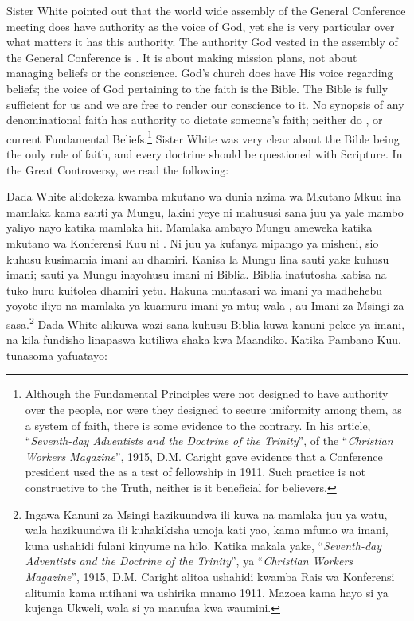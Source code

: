 Sister White pointed out that the world wide assembly of the General Conference meeting does have authority as the voice of God, yet she is very particular over what matters it has this authority. The authority God vested in the assembly of the General Conference is . It is about making mission plans, not about managing beliefs or the conscience. God’s church does have His voice regarding beliefs; the voice of God pertaining to the faith is the Bible. The Bible is fully sufficient for us and we are free to render our conscience to it. No synopsis of any denominational faith has authority to dictate someone's faith; neither do , or current Fundamental Beliefs.\footnote{Although the Fundamental Principles were not designed to have authority over the people, nor were they designed to secure uniformity among them, as a system of faith, there is some evidence to the contrary. In his article, “\textit{Seventh-day Adventists and the Doctrine of the Trinity}”, of the “\textit{Christian Workers Magazine}”, 1915, D.M. Caright gave evidence that a Conference president used the  as a test of fellowship in 1911. Such practice is not constructive to the Truth, neither is it beneficial for believers.} Sister White was very clear about the Bible being the only rule of faith, and every doctrine should be questioned with Scripture. In the Great Controversy, we read the following:


Dada White alidokeza kwamba mkutano wa dunia nzima wa Mkutano Mkuu ina mamlaka kama sauti ya Mungu, lakini yeye ni mahususi sana juu ya yale mambo yaliyo nayo katika mamlaka hii. Mamlaka ambayo Mungu ameweka katika mkutano wa Konferensi Kuu ni . Ni juu ya kufanya mipango ya misheni, sio kuhusu kusimamia imani au dhamiri. Kanisa la Mungu lina sauti yake kuhusu imani; sauti ya Mungu inayohusu imani ni Biblia. Biblia inatutosha kabisa na tuko huru kuitolea dhamiri yetu. Hakuna muhtasari wa imani ya madhehebu yoyote iliyo na mamlaka ya kuamuru imani ya mtu; wala , au Imani za Msingi za sasa.\footnote{Ingawa Kanuni za Msingi hazikuundwa ili kuwa na mamlaka juu ya watu, wala hazikuundwa ili kuhakikisha umoja kati yao, kama mfumo wa imani, kuna ushahidi fulani kinyume na hilo. Katika makala yake, “\textit{Seventh-day Adventists and the Doctrine of the Trinity}”, ya “\textit{Christian Workers Magazine}”, 1915, D.M. Caright alitoa ushahidi kwamba Rais wa Konferensi alitumia  kama mtihani wa ushirika mnamo 1911. Mazoea kama hayo si ya kujenga Ukweli, wala si ya manufaa kwa waumini.} Dada White alikuwa wazi sana kuhusu Biblia kuwa kanuni pekee ya imani, na kila fundisho linapaswa kutiliwa shaka kwa Maandiko. Katika Pambano Kuu, tunasoma yafuatayo:


